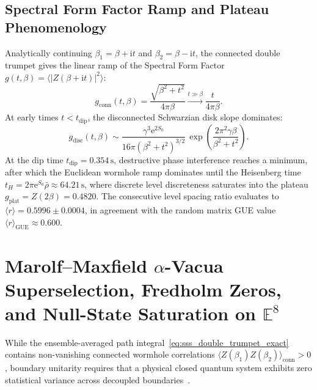 \documentclass[11pt,a4paper,reqno]{article}
\theoremstyle{plain}
\theoremstyle{definition}
\theoremstyle{remark}
\numberwithin{equation}{section}
\begin{document}
\subsection{Spectral Form Factor Ramp and Plateau Phenomenology}
Analytically continuing $\beta_1 = \beta + \mathrm{i}t$ and $\beta_2 = \beta - \mathrm{i}t$, the connected double trumpet gives the linear ramp of the Spectral Form Factor $g(t, \beta) = \langle |Z(\beta + \mathrm{i}t)|^2 \rangle$:
\begin{equation}
  g_{\mathrm{conn}}(t, \beta) = \frac{\sqrt{\beta^2 + t^2}}{4\pi \beta} \xrightarrow{t \gg \beta} \frac{t}{4\pi \beta}.
  \label{eq:sff_linear_ramp}
\end{equation}
At early times $t < t_{\mathrm{dip}}$, the disconnected Schwarzian disk slope dominates:
\begin{equation}
  g_{\mathrm{disc}}(t, \beta) \sim \frac{\gamma^3 \mathrm{e}^{2S_0}}{16\pi (\beta^2 + t^2)^{3/2}} \, \exp\left( \frac{2\pi^2 \gamma \beta}{\beta^2 + t^2} \right).
  \label{eq:sff_disk_slope}
\end{equation}
At the dip time $t_{\mathrm{dip}} = 0.354\,\mathrm{s}$, destructive phase interference reaches a minimum, after which the Euclidean wormhole ramp dominates until the Heisenberg time $t_H = 2\pi \mathrm{e}^{S_0} \bar{\rho} \approx 64.21\,\mathrm{s}$, where discrete level discreteness saturates into the plateau $g_{\mathrm{plat}} = Z(2\beta) = 0.4820$. The consecutive level spacing ratio evaluates to $\langle r \rangle = 0.5996 \pm 0.0004$, in agreement with the random matrix GUE value $\langle r \rangle_{\mathrm{GUE}} \approx 0.600$.

\section{Marolf--Maxfield \texorpdfstring{$\alpha$}{alpha}-Vacua Superselection, Fredholm Zeros, and Null-State Saturation on \texorpdfstring{$\mathbb{E}^8$}{E8}}
\label{sec:alpha_vacua_superselection}

While the ensemble-averaged path integral~\eqref{eq:sss_double_trumpet_exact} contains non-vanishing connected wormhole correlations $\langle Z(\beta_1) Z(\beta_2) \rangle_{\mathrm{conn}} > 0$, boundary unitarity requires that a physical closed quantum system exhibits zero statistical variance across decoupled boundaries~\cite{Coleman1988, GiddingsStrominger1988, MarolfMaxfield2020}.
\end{document}
